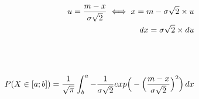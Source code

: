 \documentclass[preview]{standalone}
\begin{document}
\begin{align*}
u = {{m-x} \over {\sigma \sqrt{2}} }\iff x = m - \sigma \sqrt{2} \times u\\dx = \sigma \sqrt{2} \times du\\ \\ \\ \\ P( X \in [a;b] ) = { \frac{1}{\sqrt{\pi}} } \int_b^a { { - \frac{1}{\sigma \sqrt{2}} } exp\Big(-{ \Big( \frac{m - x}{\sigma \sqrt{2}} \Big)^2 }\Big) } \, dx
\end{align*}
\end{document}
